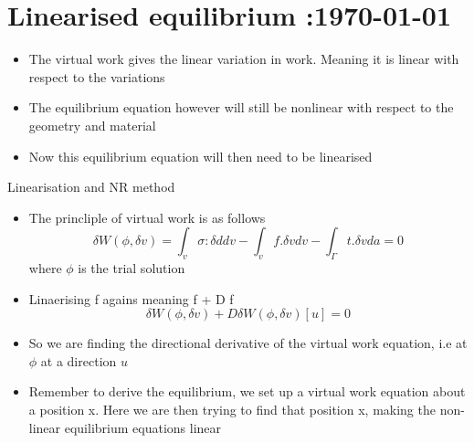 




	\tableofcontents
	\section{Linearised equilibrium :\today}


	\begin{frame}
		\begin{itemize}
			\item The virtual work gives the linear variation in work. Meaning it is linear with respect to the variations
			\item The equilibrium equation however will still be nonlinear with respect to the geometry and material
			\item Now this equilibrium equation will then need to be linearised
			
		\end{itemize}
	\end{frame}


	\begin{frame}{Linearisation and NR method}
		\begin{itemize}
			\item The princliple of virtual work is as follows 
			\begin{equation}
				\delta W(\phi,\delta v) = \int_v \sigma : \delta d dv - \int_v f.\delta v dv - \int_{\Gamma} t.\delta v da = 0
			\end{equation}
			where $\phi$ is the trial solution
			\item Linaerising f agains meaning f + D f
			\begin{equation}
			\delta W(\phi,\delta v) + D\delta W(\phi,\delta v)[u] = 0
			\end{equation}
			\item So we are finding the directional derivative of the virtual work equation, i.e at $\phi$ at a direction $u$
			\item Remember to derive the equilibrium, we set up a virtual work equation about a position x. Here we are then trying to find that position x, making the non-linear equilibrium equations linear
		\end{itemize}
	\end{frame}

